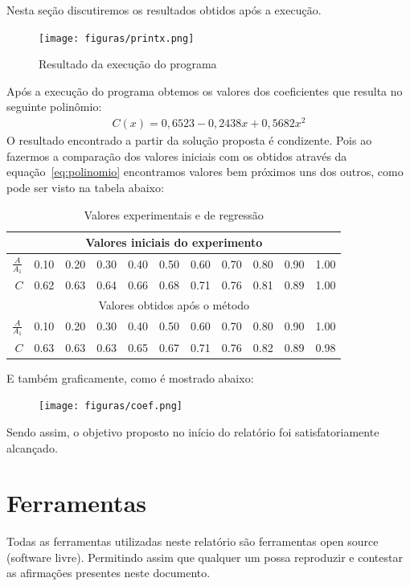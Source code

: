 \documentclass[12pt, hidelinks]{article}
\begin{document}
Nesta seção discutiremos os resultados obtidos após a execução.

\begin{figure}[!h]
  \centering
  \texttt{[image: figuras/printx.png]}\\
  \caption{Resultado da execução do programa}\label{fig:printx}
\end{figure}
Após a execução do programa obtemos os valores dos coeficientes que resulta no seguinte polinômio:
\begin{eqnarray}\label{eq:polinomio}
  C(x) = 0,6523 - 0,2438x + 0,5682x^2
\end{eqnarray}
O resultado encontrado a partir da solução proposta é condizente. Pois ao fazermos a comparação dos valores iniciais com os obtidos através da equação~\eqref{eq:polinomio} encontramos valores bem próximos uns dos outros, como pode ser visto na tabela abaixo:

\begin{table}[h]
  \centering
  \vspace{0.5cm}
  \begin{tabular}{|r|r|r|r|r|r|r|r|r|r|r|}
    \hline
    \multicolumn{11}{|c|}{Valores iniciais do experimento} \\
    \hline
      $\frac{A}{A_1}$ & 0.10 & 0.20 & 0.30 & 0.40 & 0.50 & 0.60 & 0.70 & 0.80 & 0.90 & 1.00\\
    \hline
      $C$ & 0.62 & 0.63 & 0.64 & 0.66 & 0.68 & 0.71 & 0.76 & 0.81 & 0.89 & 1.00\\
    \hline
    \multicolumn{11}{|c|}{Valores obtidos após o método} \\
    \hline
      $\frac{A}{A_1}$ & 0.10 & 0.20 & 0.30 & 0.40 & 0.50 & 0.60 & 0.70 & 0.80 & 0.90 & 1.00\\
    \hline
      $C$ & 0.63 & 0.63 & 0.63 & 0.65 & 0.67 & 0.71 & 0.76 & 0.82 & 0.89 & 0.98\\
    \hline
  \end{tabular}
  \caption{Valores experimentais e de regressão}
\end{table}

\newpage
E também graficamente, como é mostrado abaixo:
\begin{figure}[!h]
  \centering
  \texttt{[image: figuras/coef.png]}\\
\end{figure}

Sendo assim, o objetivo proposto no início do relatório foi satisfatoriamente alcançado.

\newpage
\section{Ferramentas}
Todas as ferramentas utilizadas neste relatório são ferramentas open source (software livre).
Permitindo assim que qualquer um possa reproduzir e contestar as afirmações presentes neste documento.
\end{document}
